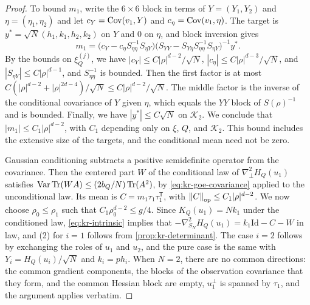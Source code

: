 \begin{proof}
To bound $m_1$, write the $6\times6$ block in terms of $Y=(Y_1,Y_2)$ and $\eta=(\eta_1,\eta_2)$ and let $c_Y=\operatorname{Cov}(v_1,Y)$ and $c_\eta=\operatorname{Cov}(v_1,\eta)$. The target is $y^*=\sqrt N(h_1,k_1,h_2,k_2)$ on $Y$ and $0$ on $\eta$, and block inversion gives
\[
m_1=\big(c_Y-c_\eta S_{\eta\eta}^{-1}S_{\eta Y}\big)\big(S_{YY}-S_{Y\eta}S_{\eta\eta}^{-1}S_{\eta Y}\big)^{-1}y^*.
\]
By the bounds on $\xi_Q^{(j)}$, we have $|c_Y|\le C|\rho|^{d-2}/\sqrt N$, $|c_\eta|\le C|\rho|^{d-3}/\sqrt N$, and $|S_{\eta Y}|\le C|\rho|^{d-1}$, and $S_{\eta\eta}^{-1}$ is bounded. Then the first factor is at most $C(|\rho|^{d-2}+|\rho|^{2d-4})/\sqrt N\le C|\rho|^{d-2}/\sqrt N$. The middle factor is the inverse of the conditional covariance of $Y$ given $\eta$, which equals the $YY$ block of $S(\rho)^{-1}$ and is bounded. Finally, we have $|y^*|\le C\sqrt N$ on $\mathcal K_2$. We conclude that $|m_1|\le C_1|\rho|^{d-2}$, with $C_1$ depending only on $\xi$, $Q$, and $\mathcal K_2$. This bound includes the extensive size of the targets, and the conditional mean need not be zero.

Gaussian conditioning subtracts a positive semidefinite operator from the covariance. Then the centered part $W$ of the conditional law of $\nabla^2_\perp H_Q(u_1)$ satisfies $\operatorname{Var}\operatorname{Tr}(WA)\le(2b_Q/N)\operatorname{Tr}(A^2)$, by \eqref{eq:kr-goe-covariance} applied to the unconditional law. Its mean is $C=m_1\tau_1\tau_1^{\mathsf T}$, with $\left\lVert C\right\rVert_{\rm op}\le C_1|\rho|^{d-2}$. We now choose $\rho_0\le\rho_1$ such that $C_1\rho_0^{d-2}\le g/4$. Since $K_Q(u_1)=Nk_1$ under the conditioned law, \eqref{eq:kr-intrinsic} implies that $-\nabla^2_{S_N}H_Q(u_1)=k_1\mathrm{Id}-C-W$ in law, and (2) for $i=1$ follows from \cref{prop:kr-determinant}. The case $i=2$ follows by exchanging the roles of $u_1$ and $u_2$, and the pure case is the same with $Y_i=H_Q(u_i)/\sqrt N$ and $k_i=ph_i$. When $N=2$, there are no common directions: the common gradient components, the blocks of the observation covariance that they form, and the common Hessian block are empty, $u_1^\perp$ is spanned by $\tau_1$, and the argument applies verbatim.
\end{proof}

